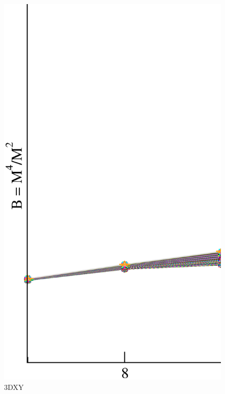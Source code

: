 \begin{figure}[!htpb]
  \centering
  \includegraphics[width=15cm]{./plots/3DXY/3DXY_BinderCumulant_vs_L.eps}
  \caption{3DXY}
\end{figure}

